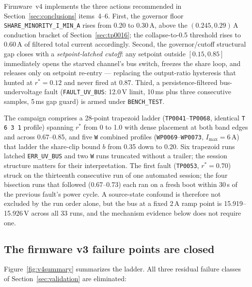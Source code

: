 \documentclass[11pt]{article}
\newcommand{\code}[1]{\texttt{#1}}
\begin{document}
Firmware~v4 implements the three actions recommended in
Section~\ref{sec:conclusions} items~4--6. First, the governor floor
\code{SHARE\_MINORITY\_I\_MIN\_A} rises from 0.20 to 0.30\,A, above the
$(0.245, 0.29)$\,A conduction bracket of Section~\ref{sec:tp0016}; the
collapse-to-0.5 threshold rises to 0.60\,A of filtered total current
accordingly. Second, the governor/cutoff structural gap closes with a
\emph{setpoint-latched cutoff}: any setpoint outside $[0.15, 0.85]$ immediately
opens the starved channel's bus switch, freezes the share loop, and releases only
on setpoint re-entry --- replacing the output-ratio hysteresis that hunted at
$r^\ast=0.12$ and never fired at 0.87. Third, a persistence-filtered
bus-undervoltage fault (\code{FAULT\_UV\_BUS}: 12.0\,V limit, 10\,ms plus three
consecutive samples, 5\,ms gap guard) is armed under \code{BENCH\_TEST}.

The campaign comprises a 28-point trapezoid ladder (\code{TP0041}--\code{TP0068},
identical \code{T 6 3 1} profile) spanning $r^\ast$ from 0 to 1.0 with dense
placement at both band edges and across 0.67--0.85, and five \code{W} combined
profiles
(\code{WP0069}--\code{WP0073}, $I_\mathrm{max}=6$\,A) that ladder the share-clip
bound $b$ from 0.35 down to 0.20. Six trapezoid runs latched
\code{ERR\_UV\_BUS} and two \code{W} runs truncated without a trailer; the
session structure matters for their interpretation. The first fault
(\code{TP0053}, $r^\ast=0.70$) struck on the thirteenth consecutive run of one
automated session; the four bisection runs that followed (0.67--0.73) each ran on
a fresh boot within 30\,s of the previous fault's power cycle. A source-state
confound is therefore not excluded by the run order alone, but the bus at a fixed
2\,A ramp point is 15.919--15.926\,V across all 33 runs, and the mechanism
evidence below does not require one.

\subsection{The firmware v3 failure points are closed}

Figure~\ref{fig:v4summary} summarizes the ladder. All three residual failure
classes of Section~\ref{sec:validation} are eliminated:
\end{document}

